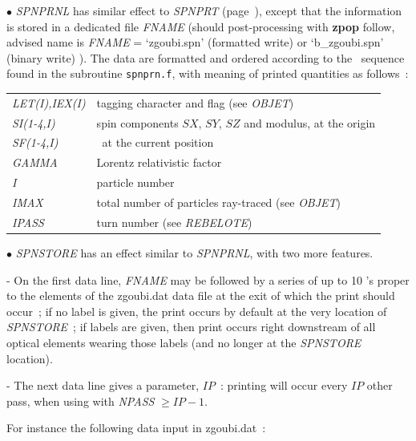 \medskip 

\noindent  $\bullet$   \textsl{SPNPRNL} has similar effect to \textsl{SPNPRT} (page~\pageref{SPNPRT}), 
except that the information is
stored in a  dedicated file \textsl{FNAME} (should post-processing with \textbf{zpop} follow, 
advised name is \textsl{FNAME} = `zgoubi.spn' (formatted write) or `b\_zgoubi.spn' (binary write) ). 
The data are formatted and ordered according to the  \FORTRAN\ sequence found in the subroutine \texttt{spnprn.f}, 
with meaning of printed quantities as follows~: 

\medskip

 \begin{tabular}{>{\sl}l!{~:}l}
	 LET(I),IEX(I)  &  tagging character and flag (see \textsl{OBJET}) \\   
	 SI(1-4,I) & spin components $SX$, $SY$, $SZ$  and modulus, at the origin\\
	 SF(1-4,I)   &  \id\, at the current position\\
	  GAMMA &   Lorentz relativistic factor\\
	  I  &  particle number\\
	 IMAX &  total number of particles ray-traced (see  \textsl{OBJET})\\
	 IPASS &  turn number (see \textsl{REBELOTE})\\
 \end{tabular}

\medskip

\noindent  $\bullet$   \textsl{SPNSTORE} has an effect similar to \textsl{SPNPRNL}, with two more features. 

- On the first data line, \textsl{FNAME} may be followed 
by a series of up to 10 \LABEL's proper to the elements of the zgoubi.dat data 
file at the exit of which the print should occur~; if no label is given, 
the print occurs by default at the very location of \textsl{SPNSTORE}~; 
if  labels are given, then print occurs right downstream of all optical elements wearing those labels
 (and no longer at the \textsl{SPNSTORE} location). 

- The next data line 
gives a parameter, $IP$~: printing will occur every $IP$ other pass, when 
using \REBELOTE{} with \textsl{NPASS} $ \geq IP-1$. 

For instance the following data input in zgoubi.dat~: 

\medskip

